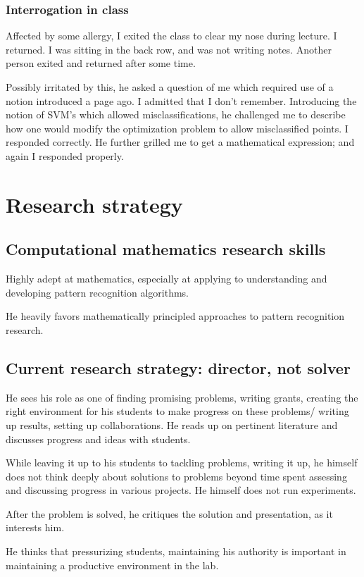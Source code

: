 \documentclass[oneside, article]{memoir}
\begin{document}
\subsubsection{Interrogation in class}
Affected by some allergy, I exited the class to clear my nose during lecture. I returned. I was sitting in the back row, and was not writing notes. Another person exited and returned after some time.

Possibly irritated by this, he asked a question of me which required use of a notion introduced a page ago. I admitted that I don't remember. Introducing the notion of SVM's which allowed misclassifications, he challenged me to describe how one would modify the optimization problem to allow misclassified points. I responded correctly. He further grilled me to get a mathematical expression; and again I responded properly.


\section{Research strategy}
\subsection{Computational mathematics research skills}
Highly adept at mathematics, especially at applying to understanding and developing pattern recognition algorithms.

He heavily favors mathematically principled approaches to pattern recognition research.

\subsection{Current research strategy: director, not solver}
He sees his role as one of finding promising problems, writing grants, creating the right environment for his students to make progress on these problems/ writing up results, setting up collaborations. He reads up on pertinent literature and discusses progress and ideas with students.

While leaving it up to his students to tackling problems, writing it up, he himself does not think deeply about solutions to problems beyond time spent assessing and discussing progress in various projects. He himself does not run experiments.

After the problem is solved, he critiques the solution and presentation, as it interests him.

He thinks that pressurizing students, maintaining his authority is important in maintaining a productive environment in the lab.
\end{document}
